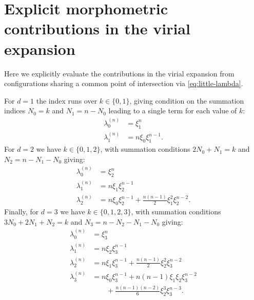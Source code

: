 \documentclass[11pt,twoside]{report}
\begin{document}

\section{Explicit morphometric contributions in the virial expansion}

Here we explicitly evaluate the contributions in the virial expansion from configurations sharing a common point of intersection via \eqref{eq:little-lambda}.

For $d=1$ the index runs over $k \in \{0,1\}$, giving condition on the summation indices $N_0 = k$ and $N_1 = n - N_0$ leading to a single term for each value of $k$:
\begin{subequations}
  \label{eq:little-lambda-d=1}
  \begin{align}
    \lambda_0^{(n)} &= \xi_1^n
    \\
    \lambda_1^{(n)} &= n \xi_0 \xi_1^{n-1}.
  \end{align}
\end{subequations}
For $d=2$ we have $k \in \{0,1,2\}$, with summation conditions $2N_0 + N_1 = k$ and $N_2 = n - N_1 - N_0$ giving:
\begin{subequations}
  \label{eq:little-lambda-d=2}
  \begin{align}
    \lambda_0^{(n)} &= \xi_2^n
    \\
    \lambda_1^{(n)} &= n \xi_1 \xi_2^{n-1}
    \\
    \lambda_2^{(n)} &=
    n \xi_0 \xi_2^{n-1}
    + \frac{n(n-1)}{2} \xi_1^2 \xi_2^{n-2}.
  \end{align}
\end{subequations}
Finally, for $d=3$ we have $k \in \{0,1,2,3\}$, with summation conditions $3N_0 + 2N_1 + N_2 = k$ and $N_3 = n - N_2 - N_1 - N_0$ giving:
\begin{subequations}
  \label{eq:little-lambda-d=3}
  \begin{align}
    \lambda_0^{(n)} &= \xi_3^n
    \\
    \lambda_1^{(n)} &= n \xi_2 \xi_3^{n-1}
    \\
    \lambda_2^{(n)} &=
    n \xi_1 \xi_3^{n-1}
    + \frac{n(n-1)}{2} \xi_2^2 \xi_3^{n-2}
    \\
    \lambda_3^{(n)} &=
    n \xi_0 \xi_3^{n-1}
    + n(n-1) \xi_1 \xi_2 \xi_3^{n-2}
    \nonumber \\ & \qquad
    + \frac{n(n-1)(n-2)}{6} \xi_2^3 \xi_3^{n-3}.
  \end{align}
\end{subequations}
\end{document}
